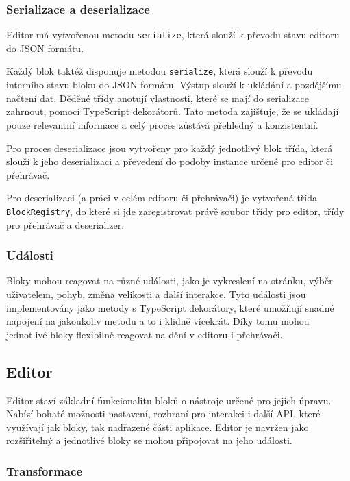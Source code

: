 \subsubsection{Serializace a deserializace}

Editor má vytvořenou metodu \texttt{serialize}, která slouží k převodu stavu editoru do JSON formátu.

Každý blok taktéž disponuje metodou \texttt{serialize}, která slouží k převodu interního stavu bloku do JSON formátu. 
Výstup slouží k ukládání a pozdějšímu načtení dat. 
Děděné třídy anotují vlastnosti, které se mají do serializace zahrnout, pomocí TypeScript dekorátorů. 
Tato metoda zajišťuje, že se ukládají pouze relevantní informace a celý proces zůstává přehledný a konzistentní.

Pro proces deserializace jsou vytvořeny pro každý jednotlivý blok třída, která slouží k jeho deserializaci a převedení do podoby instance určené pro editor či přehrávač.

Pro deserializaci (a práci v celém editoru či přehrávači) je vytvořená třída \texttt{BlockRegistry}, do které si jde zaregistrovat právě soubor třídy pro editor, třídy pro přehrávač a deserializer. 

\subsubsection{Události}

Bloky mohou reagovat na různé události, jako je vykreslení na stránku, výběr uživatelem, pohyb, změna velikosti a další interakce.
Tyto události jsou implementovány jako metody s TypeScript dekorátory, které umožňují snadné napojení na jakoukoliv metodu a to i klidně vícekrát.
Díky tomu mohou jednotlivé bloky flexibilně reagovat na dění v editoru i přehrávači.

\subsection{Editor}

Editor staví základní funkcionalitu bloků o nástroje určené pro jejich úpravu. 
Nabízí bohaté možnosti nastavení, rozhraní pro interakci i další API, které využívají jak bloky, tak nadřazené části aplikace.
Editor je navržen jako rozšiřitelný a jednotlivé bloky se mohou připojovat na jeho události.

\subsubsection{Transformace}

